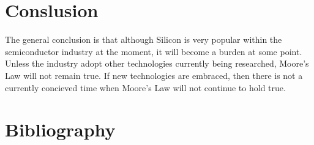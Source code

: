 \documentclass[a4paper,12pt]{article}
\begin{document}
\section{Conslusion}

The general conclusion is that although Silicon is very popular within
the semiconductor industry at the moment, it will become a burden at
some point. Unless the industry adopt other technologies currently being
researched, Moore's Law will not remain true. If new technologies are
embraced, then there is not a currently concieved time when Moore's Law
will not continue to hold true.

\section{Bibliography}


\end{document}
